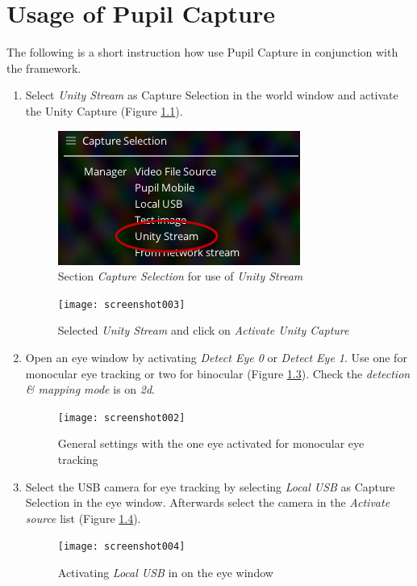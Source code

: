 \documentclass[../../Instruction_PupilCapture]{subfiles}
\begin{document}
\chapter{Usage of Pupil Capture}
The following is a short instruction how use Pupil Capture in conjunction with the framework.

\begin{enumerate}
	\item Select \textit{Unity Stream} as Capture Selection in the world window and activate the Unity Capture (Figure \ref{fig:screenshot001}).
	
	\begin{figure}[htp]
		\centering
		\includegraphics[width=0.5\linewidth]{img/screenshot001}
		\caption{Section \textit{Capture Selection} for use of \textit{Unity Stream}}
		\label{fig:screenshot001}
	\end{figure}
	\begin{figure}[htp]
		\centering
		\texttt{[image: screenshot003]}
		\caption{Selected \textit{Unity Stream} and click on \textit{Activate Unity Capture}}
		\label{fig:screenshot003} 
	\end{figure}
	\item Open an eye window by activating \textit{Detect Eye 0} or \textit{Detect Eye 1}. Use one for monocular eye tracking or two for binocular (Figure \ref{fig:screenshot002}). Check the \textit{detection \& mapping mode} is on \textit{2d}.
	\begin{figure}[htp]
		\centering
		\texttt{[image: screenshot002]}
		\caption{General settings with the one eye activated for monocular eye tracking}
		\label{fig:screenshot002}
	\end{figure}
	\item Select the USB camera for eye tracking by selecting \textit{Local USB} as Capture Selection in the eye window. Afterwards select the camera in the \textit{Activate source} list (Figure \ref{fig:screenshot004}).
	\begin{figure}[h!]
		\centering
		\texttt{[image: screenshot004]}
		\caption{Activating \textit{Local USB} in on the eye window}
		\label{fig:screenshot004}
	\end{figure}\clearpage

\end{enumerate}
\end{document}
